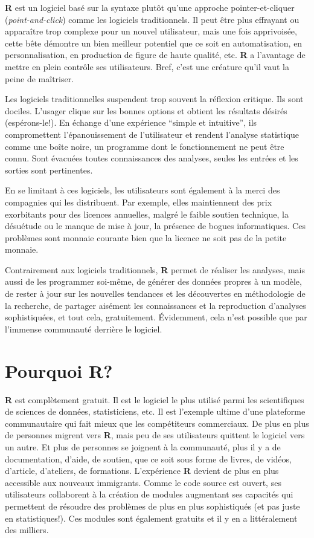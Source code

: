 \documentclass[
]{book}
\begin{document}
\textbf{R} est un logiciel basé sur la syntaxe plutôt qu'une approche pointer-et-cliquer (\emph{point-and-click}) comme les logiciels traditionnels. Il peut être plus effrayant ou apparaître trop complexe pour un nouvel utilisateur, mais une fois apprivoisée, cette bête démontre un bien meilleur potentiel que ce soit en automatisation, en personnalisation, en production de figure de haute qualité, etc. \textbf{R} a l'avantage de mettre en plein contrôle ses utilisateurs. Bref, c'est une créature qu'il vaut la peine de maîtriser.

Les logiciels traditionnelles suspendent trop souvent la réflexion critique. Ils sont dociles. L'usager clique sur les bonnes options et obtient les résultats désirés (espérons-le!). En échange d'une expérience ``simple et intuitive'', ils compromettent l'épanouissement de l'utilisateur et rendent l'analyse statistique comme une boîte noire, un programme dont le fonctionnement ne peut être connu. Sont évacuées toutes connaissances des analyses, seules les entrées et les sorties sont pertinentes.

En se limitant à ces logiciels, les utilisateurs sont également à la merci des compagnies qui les distribuent. Par exemple, elles maintiennent des prix exorbitants pour des licences annuelles, malgré le faible soutien technique, la désuétude ou le manque de mise à jour, la présence de bogues informatiques. Ces problèmes sont monnaie courante bien que la licence ne soit pas de la petite monnaie.

Contrairement aux logiciels traditionnels, \textbf{R} permet de réaliser les analyses, mais aussi de les programmer soi-même, de générer des données propres à un modèle, de rester à jour sur les nouvelles tendances et les découvertes en méthodologie de la recherche, de partager aisément les connaissances et la reproduction d'analyses sophistiquées, et tout cela, gratuitement. Évidemment, cela n'est possible que par l'immense communauté derrière le logiciel.

\hypertarget{pourquoi-r}{%
\section{\texorpdfstring{Pourquoi \textbf{R}?}{Pourquoi R?}}\label{pourquoi-r}}

\textbf{R} est complètement gratuit. Il est le logiciel le plus utilisé parmi les scientifiques de sciences de données, statisticiens, etc. Il est l'exemple ultime d'une plateforme communautaire qui fait mieux que les compétiteurs commerciaux. De plus en plus de personnes migrent vers \textbf{R}, mais peu de ses utilisateurs quittent le logiciel vers un autre. Et plus de personnes se joignent à la communauté, plus il y a de documentation, d'aide, de soutien, que ce soit sous forme de livres, de vidéos, d'article, d'ateliers, de formations. L'expérience \textbf{R} devient de plus en plus accessible aux nouveaux immigrants. Comme le code source est ouvert, ses utilisateurs collaborent à la création de modules augmentant ses capacités qui permettent de résoudre des problèmes de plus en plus sophistiqués (et pas juste en statistiques!). Ces modules sont également gratuits et il y en a littéralement des milliers.
\end{document}
